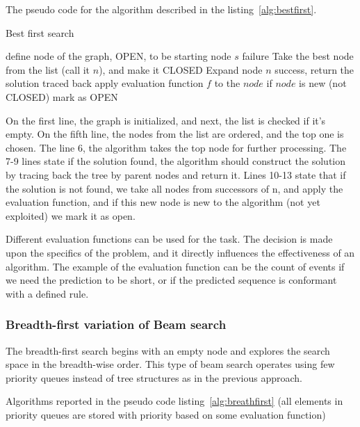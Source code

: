 The pseudo code for the algorithm described in the listing~\ref{alg:bestfirst}.


\begin{algorithm}
	\caption{Best first search}
	\label{alg:bestfirst}
	\begin{algorithmic}[1]
		\State define node of the graph, OPEN, to be starting node $s$
		\State	failure
		\EndIf
		\State Take the best node from the list (call it $n$), and make it CLOSED
		\State Expand node $n$
			\State	success, return the solution traced back
		\EndIf
		\State	apply evaluation function $f$ to the $node$\;
		\State	if $node$ is new (not CLOSED) mark as OPEN\;
		\EndFor
	\end{algorithmic}
\end{algorithm}


On the first line, the graph is initialized, and next, the list is checked if it's empty. On the fifth line, the nodes from the list are ordered, and the top one is chosen. The line 6, the algorithm takes the top node for further processing. The 7-9 lines state if the solution found, the algorithm should construct the solution by tracing back the tree by parent nodes and return it. Lines 10-13 state that if the solution is not found, we take all nodes from successors of n, and apply the evaluation function, and if this new node is new to the algorithm (not yet exploited) we mark it as open.

Different evaluation functions can be used for the task. The decision is made upon the specifics of the problem, and it directly influences the effectiveness of an algorithm. The example of the evaluation function can be the count of events if we need the prediction to be short, or if the predicted sequence is conformant with a defined rule.

\subsubsection{Breadth-first variation of Beam search}

The breadth-first search begins with an empty node and explores the search space in the breadth-wise order. This type of beam search operates using few priority queues instead of tree structures as in the previous approach. 

Algorithms reported in the pseudo code listing~\ref{alg:breathfirst} (all elements in priority queues are stored with priority based on some evaluation function)

